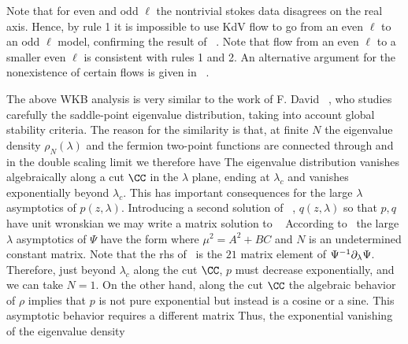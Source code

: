 Note that for even and odd $\ell$ the nontrivial stokes data disagrees
on the real axis. Hence, by rule 1 it is impossible to use KdV flow 
to go from an even $\ell$ to an odd $\ell$ model, confirming the result of 
\dss\ . Note that flow from an even $\ell$ to a smaller even $\ell$
is consistent with rules 1 and 2. An alternative argument for the 
nonexistence of certain flows is given in \David\ .


The above WKB analysis is very similar to the work
of F. David \David\ , who studies carefully the 
saddle-point eigenvalue distribution, taking into account global
stability criteria. The reason for the similarity is that, at finite
$N$ the eigenvalue density $\rho_N(\lambda)$ and the fermion 
two-point functions are connected through
\eqn{}
and in the double scaling limit we therefore have
\eqn{}
The eigenvalue distribution vanishes algebraically along a 
cut $\CC$ in the $\lambda$ plane, ending at $\lambda_c$
and vanishes exponentially beyond $\lambda_c$. This has 
important consequences for the large $\lambda$ asymptotics
of $p(z,\lambda)$. Introducing a second solution of \schrod\ ,
$q(z,\lambda)$ so that $p,q$ have unit wronskian we may 
write a matrix solution to \linsys\ 
\eqn{}
According to \wkbansatz\ the large $\lambda$ asymptotics 
of $\Psi$ have the form
\eqn{}
where $\mu^2=A^2+BC$ and $N$ is an undetermined constant matrix.
Note that the rhs of \evii\ is the $21$ matrix element of 
$\Psi^{-1}\partial_\lambda\Psi$. Therefore, just beyond $\lambda_c$
along the cut $\CC$, $p$ must decrease exponentially, 
and we can take $N=1$. On the other hand, along the cut 
$\CC$ the algebraic behavior of $\rho$ implies that $p$ 
is not pure exponential but instead is a cosine or a sine. 
This asymptotic behavior requires a different matrix
\eqn{}
Thus, the exponential vanishing of the eigenvalue density 
